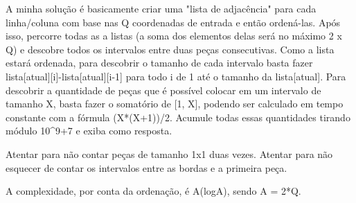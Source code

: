A minha solução é basicamente criar uma "lista de adjacência" para cada linha/coluna com base nas Q coordenadas de entrada e então ordená-las. Após isso, percorre todas as a listas (a soma dos elementos delas será no máximo 2 x Q) e descobre todos os intervalos entre duas peças consecutivas. Como a lista estará ordenada, para descobrir o tamanho de cada intervalo basta fazer lista[atual][i]-lista[atual][i-1] para todo i de 1 até o tamanho da lista[atual]. Para descobrir a quantidade de peças que é possível colocar em um intervalo de tamanho X, basta fazer o somatório de [1, X], podendo ser calculado em tempo constante com a fórmula
(X*(X+1))/2. Acumule todas essas quantidades tirando módulo 10^9+7 e exiba como resposta.

Atentar para não contar peças de tamanho 1x1 duas vezes.
Atentar para não esquecer de contar os intervalos entre as bordas e a primeira peça.


A complexidade, por conta da ordenação, é A(logA), sendo A = 2*Q.
